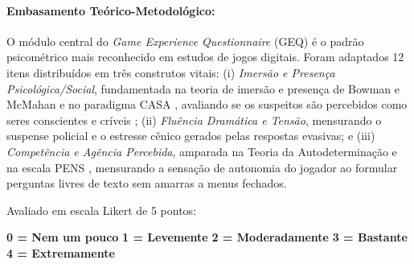 \paragraph*{Embasamento Teórico-Metodológico:} O módulo central do \textit{Game Experience Questionnaire} (GEQ) \cite{ijsselsteijn2013game} é o padrão psicométrico mais reconhecido em estudos de jogos digitais. Foram adaptados 12 itens distribuídos em três construtos vitais: (i) \textit{Imersão e Presença Psicológica/Social}, fundamentada na teoria de imersão e presença de Bowman e McMahan \cite{bowman2007virtual} e no paradigma CASA \cite{nass2000machines}, avaliando se os suspeitos são percebidos como seres conscientes e críveis \cite{bates1994role}; (ii) \textit{Fluência Dramática e Tensão}, mensurando o suspense policial e o estresse cênico gerados pelas respostas evasivas; e (iii) \textit{Competência e Agência Percebida}, amparada na Teoria da Autodeterminação e na escala PENS \cite{ryan2006motivational}, mensurando a sensação de autonomia do jogador ao formular perguntas livres de texto sem amarras a menus fechados.

\noindent Avaliado em escala Likert de 5 pontos:
\begin{center}
\textbf{0 = Nem um pouco} \quad \textbf{1 = Levemente} \quad \textbf{2 = Moderadamente} \quad \textbf{3 = Bastante} \quad \textbf{4 = Extremamente}
\end{center}

